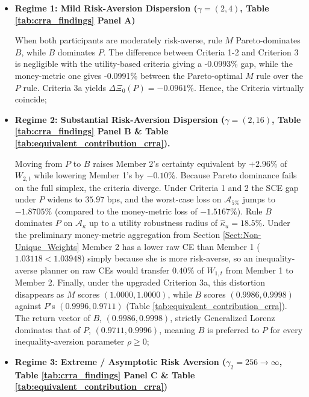 \documentclass[11pt,a4paper]{article}
\theoremstyle{definition}
\theoremstyle{plain}
\theoremstyle{remark}
\newcommand{\1}{\mathbf{1}}
\begin{document}
\begin{itemize}
    \item \textbf{Regime 1: Mild Risk-Aversion Dispersion ($\gamma = (2, 4)$, Table \ref{tab:crra_findings} Panel A)}
    
    When both participants are moderately risk-averse, rule $M$ Pareto-dominates $B$, while $B$ dominates $P$. The difference between Criteria 1-2 and Criterion 3 is negligible with the utility-based criteria giving a -0.0993\% gap, while the money-metric one gives -0.0991\% between the Pareto-optimal $M$ rule over the $P$ rule. Criteria 3a yields $\Delta \Xi_0(P) = -0.0961\%$. Hence, the Criteria virtually coincide;

    \item \textbf{Regime 2: Substantial Risk-Aversion Dispersion ($\gamma = (2, 16)$, Table \ref{tab:crra_findings} Panel B \& Table \ref{tab:equivalent_contribution_crra}).}
    
    Moving from $P$ to $B$ raises Member 2's certainty equivalent by $+2.96\%$ of $W_{2,t}$ while lowering Member 1's by $-0.10\%$. Because Pareto dominance fails on the full simplex, the criteria diverge. Under Criteria 1 and 2 the SCE gap under $P$ widens to $35.97$ bps, and the worst-case loss on $\mathcal{A}_{5\%}$ jumps to $-1.8705\%$ (compared to the money-metric loss of $-1.5167\%$). Rule $B$ dominates $P$ on $\mathcal{A}_\kappa$ up to a utility robustness radius of $\hat{\kappa}_u = 18.5\%$. Under the preliminary money-metric aggregation from Section \ref{Sect:Non-Unique_Weights} Member 2 has a lower raw CE than Member 1 ($1.03118 < 1.03948$) simply because she is more risk-averse, so an inequality-averse planner on raw CEs would transfer $0.40\%$ of $W_{1,t}$ from Member 1 to Member 2. Finally, under the upgraded Criterion 3a, this distortion disappears as $M$ scores $(1.0000, 1.0000)$, while $B$ scores $(0.9986, 0.9998)$ against $P$'s $(0.9996, 0.9711)$ (Table \ref{tab:equivalent_contribution_crra}). The return vector of $B$, $(0.9986, 0.9998)$, strictly Generalized Lorenz dominates that of $P$, $(0.9711, 0.9996)$, meaning $B$ is preferred to $P$ for every inequality-aversion parameter $\rho \geq 0$;

    \item \textbf{Regime 3: Extreme / Asymptotic Risk Aversion ($\gamma_2 = 256 \to \infty$, Table \ref{tab:crra_findings} Panel C \& Table \ref{tab:equivalent_contribution_crra})}
    

\end{itemize}
\end{document}
